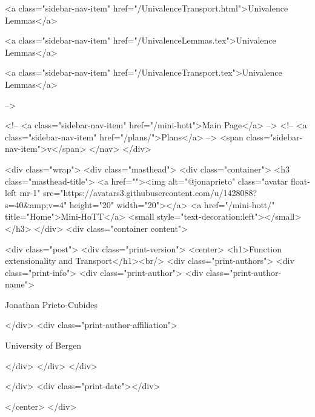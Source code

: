       
    
      
        
          <a class="sidebar-nav-item" href="/UnivalenceTransport.html">Univalence Lemmas</a>
        
      
    
      
        
          <a class="sidebar-nav-item" href="/UnivalenceLemmas.tex">Univalence Lemmas</a>
        
      
    
      
        
          <a class="sidebar-nav-item" href="/UnivalenceTransport.tex">Univalence Lemmas</a>
        
      
     -->

    <!-- <a class="sidebar-nav-item" href="/mini-hott">Main Page</a> -->
    <!-- <a class="sidebar-nav-item" href="/plans/">Plans</a> -->
    <span class="sidebar-nav-item">v</span>
  </nav>
</div>

    <div class="wrap">
      <div class="masthead">
        <div class="container">
          <h3 class="masthead-title">
            <a href=""><img alt="@jonaprieto" class="avatar float-left mr-1" src="https://avatars3.githubusercontent.com/u/1428088?s=40&amp;v=4" height="20" width="20"></a>
            <a href="/mini-hott/" title="Home">Mini-HoTT</a>
            <small style="text-decoration:left"></small>
          </h3>
        </div>
      <div class="container content">
        







<div class="post">
  <div class="print-version">
    <center>
      <h1>Function extensionality and Transport</h1><br/>
        <div class="print-authors">
          <div class="print-info">
            <div class="print-author">
              <div class="print-author-name">
                
                  Jonathan Prieto-Cubides
                
              </div>
              <div class="print-author-affiliation">
                
                  University of Bergen
                
                </div>
            </div>
          </div>
          
          
        </div>
        <div class="print-date"></div>
        
        
    </center>
  </div>

